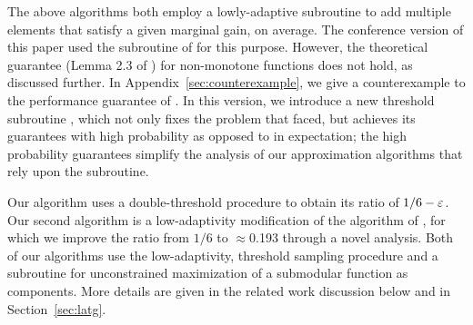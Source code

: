 The above algorithms both employ a lowly-adaptive
subroutine to add
multiple elements that satisfy a given marginal gain,
on average.
The conference version \cite{kuhnle2021nearly} of this paper
used
the \thresam subroutine of
 for this purpose.
However, the theoretical guarantee (Lemma 2.3 of ) for non-monotone functions
does not hold, as discussed further. 
In Appendix~\ref{sec:counterexample}, we give a counterexample to the performance guarantee of \thresam.
In this version,
we introduce a new threshold subroutine \threseq,
which not only fixes the problem that \thresam faced,
but achieves its guarantees with high probability
as opposed to in expectation; the high probability guarantees
simplify the analysis of our approximation algorithms that
rely upon the \threseq subroutine. 



Our algorithm \atg uses a double-threshold procedure to obtain
its ratio of $1/6 - \varepsilon$. Our second algorithm \latg 
is a low-adaptivity modification of the algorithm of , for which 
we improve the ratio from $1/6$ to $\approx$0.193 through a novel analysis.
Both of our algorithms use the low-adaptivity, threshold sampling procedure
\threseq and a subroutine for 
unconstrained maximization of a submodular function \cite{Feige2011,Chen2018b}
as components.
More details are given in the related work
discussion below and in Section~\ref{sec:latg}.

